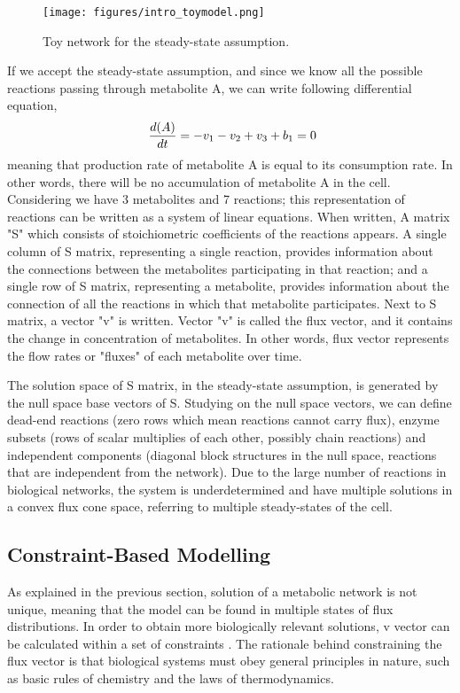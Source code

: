\begin{figure}[H]
\begin{center}
\texttt{[image: figures/intro\_toymodel.png]}
\end{center}
\caption[Toy network for the steady-state assumption]{Toy network for the steady-state assumption.}
\label{fig:ToyNetwork}
\end{figure}
\vspace{-0.5cm}

If we accept the steady-state assumption, and since we know all the possible reactions passing through metabolite A, we can write following differential equation,
\begin{equation}
 \ \frac{d(A)}{dt} = - v_1 - v_2 + v_3 + b_1 = 0 \\
\end{equation}
meaning that production rate of metabolite A is equal to its consumption rate. In other words, there will be no accumulation of metabolite A in the cell. Considering we have 3 metabolites and 7 reactions; this representation of reactions can be written as a system of linear equations. When written, A matrix "S" which consists of stoichiometric coefficients of the reactions appears. A single column of S matrix, representing a single reaction, provides information about the connections between the metabolites participating in that reaction; and a single row of S matrix, representing a metabolite, provides information about the connection of all the reactions in which that metabolite participates. Next to S matrix, a vector "v" is written. Vector "v" is called the flux vector, and it contains the change in concentration of metabolites. In other words, flux vector represents the flow rates or "fluxes" of each metabolite over time.

The solution space of S matrix, in the steady-state assumption, is generated by the null space base vectors of S. Studying on the null space vectors, we can define dead-end reactions (zero rows which mean reactions cannot carry flux), enzyme subsets (rows of scalar multiplies of each other, possibly chain reactions) and independent components (diagonal block structures in the null space, reactions that are independent from the network). Due to the large number of reactions in biological networks, the system is underdetermined and have multiple solutions in a convex flux cone space, referring to multiple steady-states of the cell.

\subsection{Constraint-Based Modelling}
As explained in the previous section, solution of a metabolic network is not unique, meaning that the model can be found in multiple states of flux distributions. In order to obtain more biologically relevant solutions, v vector can be calculated within a set of constraints \cite{thiele2007bringing}. The rationale behind constraining the flux vector is that biological systems must obey general principles in nature, such as basic rules of chemistry and the laws of thermodynamics.


